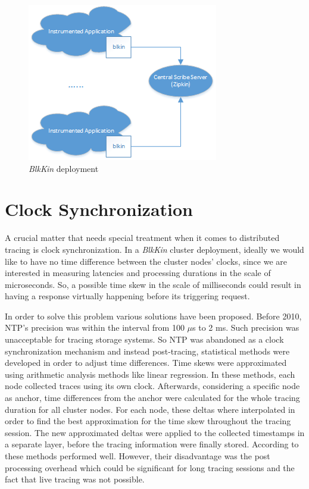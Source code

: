 \documentclass[a4paper,10pt,twocolumn]{article}
\begin{document}
\begin{figure}[h!]
  \centering
  \includegraphics[scale=0.75]{images/generic.png}
  \caption{\emph{BlkKin} deployment}
  \label{fig:generic}
\end{figure}

\section{Clock Synchronization}

A crucial matter that needs special treatment when it comes to distributed
tracing is clock synchronization. In a \emph{BlkKin} cluster deployment, ideally
we would like to have no time difference between the cluster nodes' clocks,
since we are interested in measuring latencies and processing durations in the
scale of microseconds. So, a possible time skew in the scale of milliseconds
could result in having a response virtually happening before its triggering
request.

In order to solve this problem various solutions have been proposed. Before
2010, NTP's precision was within the interval from 100 $\mu$s to 2 ms. Such
precision was unacceptable for tracing storage systems. So NTP was abandoned as
a clock synchronization mechanism and instead post-tracing, statistical methods
were developed in order to adjust time differences. Time skews were approximated
using arithmetic analysis methods like linear regression. In these methods, each
node collected traces using its own clock. Afterwards, considering a specific
node as anchor, time differences from the anchor were calculated for the whole
tracing duration for all cluster nodes. For each node, these deltas where
interpolated in order to find the best approximation for the time skew
throughout the tracing session. The new approximated deltas were applied to the
collected timestamps in a separate layer, before the tracing information were
finally stored. According to \cite{hp} these methods performed well. However,
their disadvantage was the post processing overhead which could be significant
for long tracing sessions and the fact that live tracing was not possible.
\end{document}
